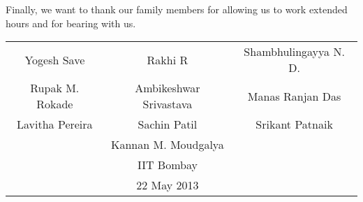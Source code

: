 Finally, we want to thank our family members for allowing us to work
extended hours and for bearing with us. \\ [1cm]

\setlength{\tabcolsep}{0.5cm}
\begin{center}
\begin{tabular}{ccc}
Yogesh Save & Rakhi R & Shambhulingayya N. D. \\ [1mm]
Rupak M. Rokade & Ambikeshwar Srivastava & Manas Ranjan Das \\ [1mm] 
Lavitha Pereira & Sachin Patil & Srikant Patnaik \\ [1mm]
& Kannan M. Moudgalya \\ [5mm]
& IIT Bombay \\
& 22 May 2013
\end{tabular}
\end{center}

\cleardoublepage
